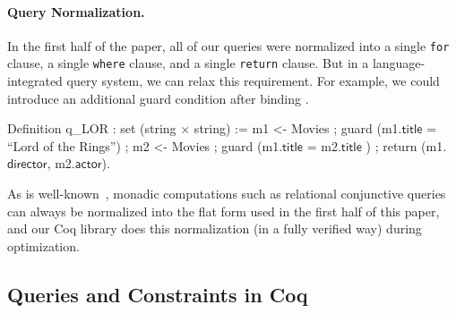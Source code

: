 \documentclass[preprint]{sigplanconf}
\begin{document}

\paragraph{Query Normalization.} In the first half of the paper, all of our queries were normalized into a single {\tt for} clause, a single {\tt where} clause, and a single {\tt return} clause.  But in a language-integrated query system, we can relax this requirement.  For example, we could introduce an additional guard condition after binding .
\begin{coq}
Definition q_LOR : set (string $\times$ string) :=
  m1 <- Movies ;
  guard (m1.$\textsf{title}$ = ``Lord of the Rings'') ;
  m2 <- Movies ;
  guard (m1.$\textsf{title}$  = m2.$\textsf{title}$ ) ;
  return (m1.$\textsf{director}$, m2.$\textsf{actor}$).
\end{coq}
As is well-known~\cite{monad}, monadic computations such as relational conjunctive queries can always be normalized into the flat form used in the first half of this paper, and our Coq library does this normalization (in a fully verified way) during optimization.

\subsection{Queries and Constraints in Coq}
\end{document}
